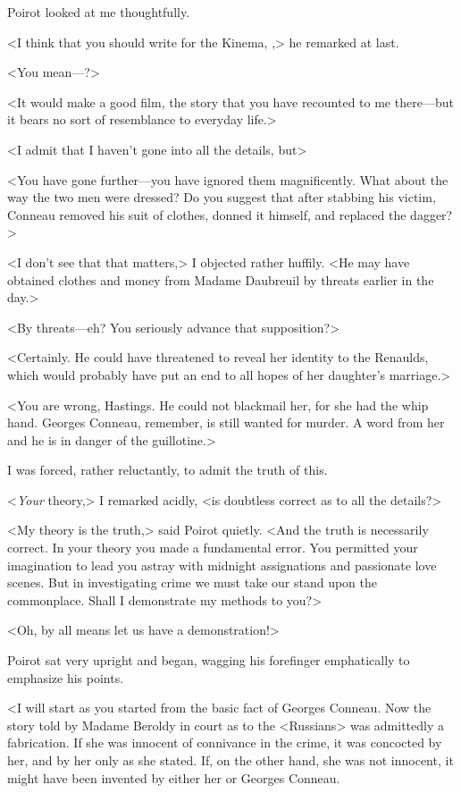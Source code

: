 Poirot looked at me thoughtfully. 

 <I think that you should write for the Kinema, ,> he remarked at last. 

 <You mean—?> 

 <It would make a good film, the story that you have recounted to me there—but it bears no sort of resemblance to everyday life.> 

 <I admit that I haven't gone into all the details, but\longdash> 

 <You have gone further—you have ignored them magnificently. What about the way the two men were dressed? Do you suggest that after stabbing his victim, Conneau removed his suit of clothes, donned it himself, and replaced the dagger?> 

 <I don't see that that matters,> I objected rather huffily. <He may have obtained clothes and money from Madame Daubreuil by threats earlier in the day.> 

 <By threats—eh? You seriously advance that supposition?> 

 <Certainly. He could have threatened to reveal her identity to the Renaulds, which would probably have put an end to all hopes of her daughter's marriage.> 

 <You are wrong, Hastings. He could not blackmail her, for she had the whip hand. Georges Conneau, remember, is still wanted for murder. A word from her and he is in danger of the guillotine.> 

 I was forced, rather reluctantly, to admit the truth of this. 

 <\emph{Your} theory,> I remarked acidly, <is doubtless correct as to all the details?> 

 <My theory is the truth,> said Poirot quietly. <And the truth is necessarily correct. In your theory you made a fundamental error. You permitted your imagination to lead you astray with midnight assignations and passionate love scenes. But in investigating crime we must take our stand upon the commonplace. Shall I demonstrate my methods to you?> 

 <Oh, by all means let us have a demonstration!> 

 Poirot sat very upright and began, wagging his forefinger emphatically to emphasize his points. 

<I will start as you started from the basic fact of Georges Conneau. Now the story told by Madame Beroldy in court as to the <Russians> was admittedly a fabrication. If she was innocent of connivance in the crime, it was concocted by her, and by her only as she stated. If, on the other hand, she was not innocent, it might have been invented by either her or Georges Conneau. 

